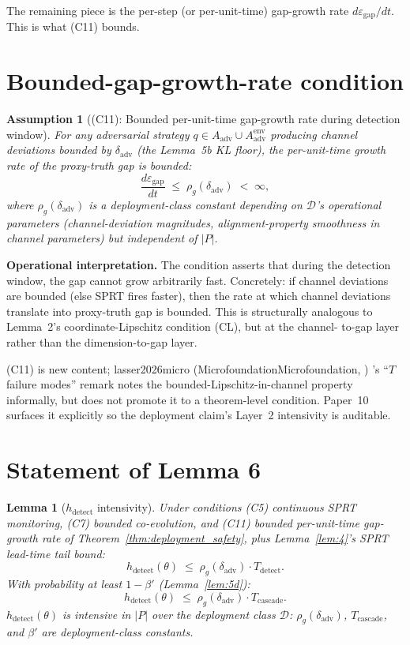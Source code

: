 \documentclass{article}
\makeatletter
\newcommand{\citep}[2][]{%
  \begingroup
  \def\@tmpkey{#2}%
  \ifx\@tmpkey\@empty\else
    (\ifx\@empty#1\@empty\else #1, \fi
     \@nameuse{bibkey@\@tmpkey})%
  \fi
  \endgroup
}
\newtheorem{lemma}{Lemma}
\newtheorem{assumption}{Assumption}
\newcommand{\Aadv}{A_{\mathrm{adv}}}
\newcommand{\deltaadv}{\delta_{\mathrm{adv}}}
\newcommand{\epsgap}{\varepsilon_{\mathrm{gap}}}
\makeatother
\begin{document}
The remaining piece is the per-step (or per-unit-time) gap-growth
rate $d\epsgap/dt$.  This is what (C11) bounds.

\section{Bounded-gap-growth-rate condition}

\begin{assumption}[(C11): Bounded per-unit-time gap-growth rate during detection window]
\label{ass:C11}
For any adversarial strategy $q \in \Aadv \cup
\Aadv^{\mathrm{env}}$ producing channel deviations bounded by
$\deltaadv$ (the Lemma~5b KL floor), the per-unit-time growth rate
of the proxy-truth gap is bounded:
\[
  \frac{d \epsgap}{dt} \;\leq\; \rho_g(\deltaadv) \;<\; \infty,
\]
where $\rho_g(\deltaadv)$ is a deployment-class constant depending
on $\mathcal{D}$'s operational parameters (channel-deviation
magnitudes, alignment-property smoothness in channel parameters)
but independent of $|P|$.
\end{assumption}

\textbf{Operational interpretation.}  The condition asserts that
during the detection window, the gap cannot grow arbitrarily fast.
Concretely: if channel deviations are bounded (else SPRT fires
faster), then the rate at which channel deviations translate into
proxy-truth gap is bounded.  This is structurally analogous to
Lemma~2's coordinate-Lipschitz condition (CL), but at the channel-
to-gap layer rather than the dimension-to-gap layer.

(C11) is new content; \citep[Microfoundation]{lasser2026micro}'s
``$T$ failure modes'' remark notes the bounded-Lipschitz-in-channel
property informally, but does not promote it to a theorem-level
condition.  Paper~10 surfaces it explicitly so the deployment
claim's Layer~2 intensivity is auditable.

\section{Statement of Lemma 6}

\begin{lemma}[$h_{\mathrm{detect}}$ intensivity]
\label{lem:6}
Under conditions (C5) continuous SPRT monitoring, (C7) bounded
co-evolution, and (C11) bounded per-unit-time gap-growth rate of
Theorem~\ref{thm:deployment_safety}, plus Lemma~\ref{lem:4}'s
SPRT lead-time tail bound:
\[
  h_{\mathrm{detect}}(\theta) \;\leq\; \rho_g(\deltaadv) \cdot
  T_{\mathrm{detect}}.
\]
With probability at least $1 - \beta'$ (Lemma~\ref{lem:5d}):
\[
  h_{\mathrm{detect}}(\theta) \;\leq\; \rho_g(\deltaadv) \cdot
  T_{\mathrm{cascade}}.
\]
$h_{\mathrm{detect}}(\theta)$ is intensive in $|P|$ over the
deployment class $\mathcal{D}$: $\rho_g(\deltaadv)$,
$T_{\mathrm{cascade}}$, and $\beta'$ are deployment-class constants.
\end{lemma}
\end{document}
